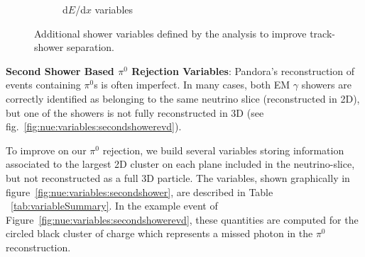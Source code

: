 \begin{figure}[H]
\begin{center}
\begin{subfigure}[b]{0.27\textwidth}
    \caption{\label{fig:nue:variables:dedx} d$E$/d$x$ variables }
    \end{subfigure}
\caption{\label{fig:nue:presel:eff} Additional shower variables defined by the analysis to improve track-shower separation.}
\end{center}
\end{figure}

\par \noindent  \textbf{Second Shower Based $\pi^0$ Rejection Variables}: %
Pandora's reconstruction of events containing $\pi^0$s is often imperfect. In many cases, both EM $\gamma$ showers are correctly identified as belonging to the same neutrino slice (reconstructed in 2D), but one of the showers is not fully reconstructed in 3D (see fig.~\ref{fig:nue:variables:secondshowerevd}).

To improve on our $\pi^0$ rejection, we build several variables storing information associated to the largest 2D cluster on each plane included in the neutrino-slice, but not reconstructed as a full 3D particle. The variables, shown graphically in figure~\ref{fig:nue:variables:secondshower}, are described in Table ~\ref{tab:variableSummary}. In the example event of Figure~\ref{fig:nue:variables:secondshowerevd}, these quantities are computed for the circled black cluster of charge which represents a missed photon in the $\pi^0$ reconstruction.

